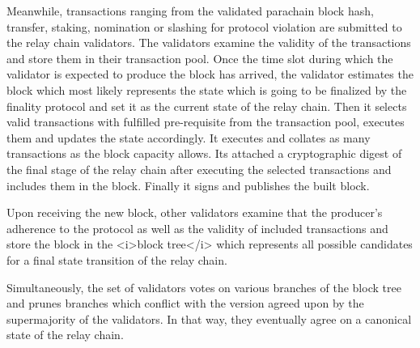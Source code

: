 Meanwhile, transactions ranging from the validated parachain block hash, transfer, staking, nomination or slashing for protocol violation are submitted to the relay chain validators. The validators examine the validity of the transactions and store them in their transaction pool. Once the time slot during which the validator is expected to produce the block has arrived, the validator estimates the block which most likely represents the state which is going to be finalized by the finality protocol and set it as the current state of the relay chain. Then it selects valid transactions with fulfilled pre-requisite from the transaction pool, executes them and updates the state accordingly. It executes and collates as many transactions as the block capacity allows. Its attached a cryptographic digest of the final stage of the relay chain after executing the selected transactions and includes them in the block. Finally it signs and publishes the built block.

Upon receiving the new block, other validators examine that the producer's adherence to the protocol as well as the validity of included transactions and store the block in the <i>block tree</i> which represents all possible candidates for a final state transition of the relay chain. 

Simultaneously, the set of validators votes on various branches of the block tree and prunes branches which conflict with the version agreed upon by the supermajority of the validators. In that way, they eventually agree on a canonical state of the relay chain.
